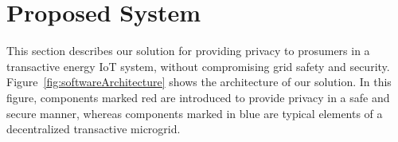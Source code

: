 \section{Proposed System}

This section describes our solution for providing privacy to prosumers
in a transactive energy IoT system, without compromising grid safety
and security.
Figure~\ref{fig:softwareArchitecture} shows the architecture of 
our solution.  In this figure, components marked red are introduced to
provide privacy in a safe and secure manner, whereas components marked
in blue are typical elements of a decentralized transactive microgrid.

